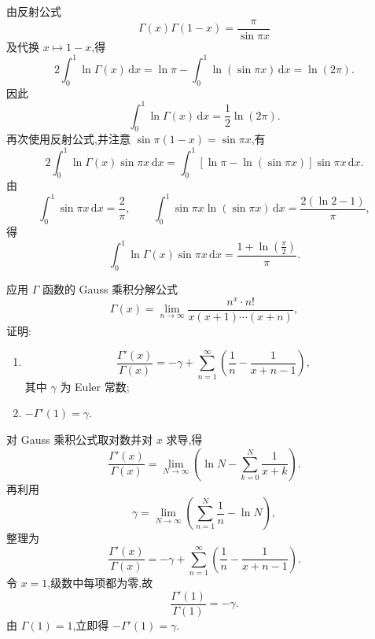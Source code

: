 \begin{solution}
    由反射公式
    \[
        \Gamma(x)\Gamma(1-x)=\dfrac{\pi}{\sin\pi x}
    \]
    及代换 $x\mapsto1-x$,得
    \[
        2\int_0^1\ln\Gamma(x)\,\mathrm{d}x
        =\ln\pi-\int_0^1\ln(\sin\pi x)\,\mathrm{d}x
        =\ln(2\pi).
    \]
    因此
    \[
        \displaystyle\int_0^1\ln\Gamma(x)\,\mathrm{d}x=\dfrac{1}{2}\ln(2\pi).
    \]
    再次使用反射公式,并注意 $\sin\pi(1-x)=\sin\pi x$,有
    \[
        2\int_0^1\ln\Gamma(x)\sin\pi x\,\mathrm{d}x
        =\int_0^1\left[\ln\pi-\ln(\sin\pi x)\right]\sin\pi x\,\mathrm{d}x.
    \]
    由
    \[
        \displaystyle\int_0^1\sin\pi x\,\mathrm{d}x=\dfrac{2}{\pi},
        \qquad
        \int_0^1\sin\pi x\ln(\sin\pi x)\,\mathrm{d}x
        =\dfrac{2(\ln2-1)}{\pi},
    \]
    得
    \[
        \displaystyle\int_0^1\ln\Gamma(x)\sin\pi x\,\mathrm{d}x
        =\dfrac{1+\ln\left(\frac{\pi}{2}\right)}{\pi}.
    \]
\end{solution}

\begin{example}[\markstar]
    应用 $\Gamma$ 函数的 Gauss 乘积分解公式
    \[
        \Gamma(x)=\lim\limits_{n\to\infty}\dfrac{n^x\cdot n!}{x(x+1)\cdots(x+n)},
    \]
    证明:
    \begin{enumerate}
        \item
              \[
                  \dfrac{\Gamma'(x)}{\Gamma(x)}
                  =-\gamma+\sum\limits_{n=1}^{\infty}\left(\dfrac{1}{n}-\dfrac{1}{x+n-1}\right),
              \]
              其中 $\gamma$ 为 Euler 常数;
        \item $-\Gamma'(1)=\gamma$.
    \end{enumerate}
\end{example}
\exampleblank

\begin{solution}
    对 Gauss 乘积公式取对数并对 $x$ 求导,得
    \[
        \dfrac{\Gamma'(x)}{\Gamma(x)}
        =\lim\limits_{N\to\infty}
        \left(\ln N-\sum\limits_{k=0}^N\dfrac{1}{x+k}\right).
    \]
    再利用
    \[
        \gamma=\lim\limits_{N\to\infty}
        \left(\sum\limits_{n=1}^N\dfrac{1}{n}-\ln N\right),
    \]
    整理为
    \[
        \dfrac{\Gamma'(x)}{\Gamma(x)}
        =-\gamma+\sum\limits_{n=1}^{\infty}
        \left(\dfrac{1}{n}-\dfrac{1}{x+n-1}\right).
    \]
    令 $x=1$,级数中每项都为零,故
    \[
        \dfrac{\Gamma'(1)}{\Gamma(1)}=-\gamma.
    \]
    由 $\Gamma(1)=1$,立即得 $-\Gamma'(1)=\gamma$.
\end{solution}

